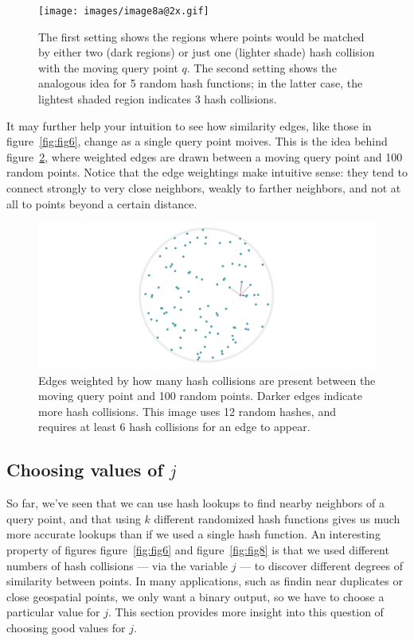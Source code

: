 \documentclass[20pt,]{extarticle}
\begin{document}
\begin{figure}
\centering
\texttt{[image: images/image8a@2x.gif]}
\caption{The first setting shows the regions where points would be
matched by either two (dark regions) or just one (lighter shade) hash
collision with the moving query point \(q\). The second setting shows
the analogous idea for 5 random hash functions; in the latter case, the
lightest shaded region indicates 3 hash collisions.}\label{fig:fig8a}
\end{figure}

It may further help your intuition to see how similarity edges, like
those in figure~\ref{fig:fig6}, change as a single query point moives.
This is the idea behind figure~\ref{fig:fig8b}, where weighted edges are
drawn between a moving query point and 100 random points. Notice that
the edge weightings make intuitive sense: they tend to connect strongly
to very close neighbors, weakly to farther neighbors, and not at all to
points beyond a certain distance.

\begin{figure}
\centering
\includegraphics{images/image8b@2x.gif}
\caption{Edges weighted by how many hash collisions are present between
the moving query point and 100 random points. Darker edges indicate more
hash collisions. This image uses 12 random hashes, and requires at least
6 hash collisions for an edge to appear.}\label{fig:fig8b}
\end{figure}

\subsection{\texorpdfstring{Choosing values of
\(j\)}{Choosing values of j}}\label{choosing-values-of-j}

So far, we've seen that we can use hash lookups to find nearby neighbors
of a query point, and that using \(k\) different randomized hash
functions gives us much more accurate lookups than if we used a single
hash function. An interesting property of figures figure~\ref{fig:fig6}
and figure~\ref{fig:fig8} is that we used different numbers of hash
collisions --- via the variable \(j\) --- to discover different degrees
of similarity between points. In many applications, such as findin near
duplicates or close geospatial points, we only want a binary output, so
we have to choose a particular value for \(j\). This section provides
more insight into this question of choosing good values for \(j\).
\end{document}
